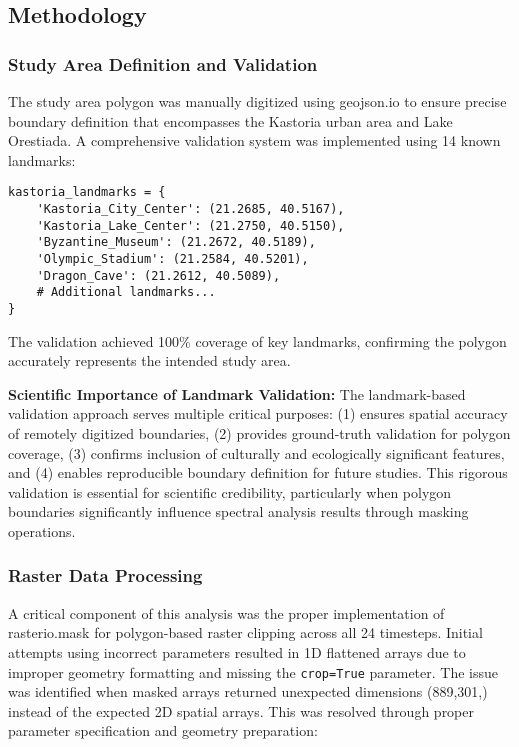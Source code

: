 \documentclass[a4paper,12pt]{article}
\begin{document}
\subsection{Methodology}

\subsubsection{Study Area Definition and Validation}

The study area polygon was manually digitized using geojson.io to ensure
precise boundary definition that encompasses the Kastoria urban area and Lake
Orestiada. A comprehensive validation system was implemented using 14 known
landmarks:

\begin{lstlisting}[caption=Landmark-based polygon validation system]
kastoria_landmarks = {
    'Kastoria_City_Center': (21.2685, 40.5167),
    'Kastoria_Lake_Center': (21.2750, 40.5150),
    'Byzantine_Museum': (21.2672, 40.5189),
    'Olympic_Stadium': (21.2584, 40.5201),
    'Dragon_Cave': (21.2612, 40.5089),
    # Additional landmarks...
}
\end{lstlisting}

The validation achieved 100\% coverage of key landmarks, confirming the polygon
accurately represents the intended study area.

\textbf{Scientific Importance of Landmark Validation:} The landmark-based
validation approach serves multiple critical purposes: (1) ensures spatial
accuracy of remotely digitized boundaries, (2) provides ground-truth validation
for polygon coverage, (3) confirms inclusion of culturally and ecologically
significant features, and (4) enables reproducible boundary definition for
future studies. This rigorous validation is essential for scientific credibility,
particularly when polygon boundaries significantly influence spectral analysis
results through masking operations.

\subsubsection{Raster Data Processing}

A critical component of this analysis was the proper implementation of
rasterio.mask for polygon-based raster clipping across all 24 timesteps. Initial attempts using
incorrect parameters resulted in 1D flattened arrays due to improper geometry
formatting and missing the \texttt{crop=True} parameter. The issue was
identified when masked arrays returned unexpected dimensions (889,301,) instead
of the expected 2D spatial arrays. This was resolved through proper parameter
specification and geometry preparation:
\end{document}
